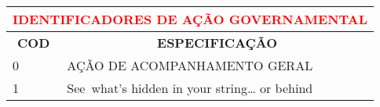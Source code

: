 \documentclass{article}
\newcommand\Tstrut{\rule{0pt}{2em}}       %
\begin{document}

\begin{longtable}[c]{m{1cm}|m{11cm}}

\multicolumn{2}{c}{\cellcolor{gray!50} \textcolor{red} {\normalsize \textbf{IDENTIFICADORES DE AÇÃO GOVERNAMENTAL}}}\Tstrut  \\[2ex]

\hline\hline
 \multicolumn{1}{c|}{\textbf{ COD }} & \multicolumn{1}{c}{\textbf{ ESPECIFICAÇÃO }} \\ %
\hline
\endfirsthead %


 \endhead %


 \endfoot %

 \hline\hline\hline %

 \endlastfoot %

0 & AÇÃO DE ACOMPANHAMENTO GERAL\\
1 & See what's hidden in your string…	or be​hind﻿\\

\end{longtable}
\end{document}
